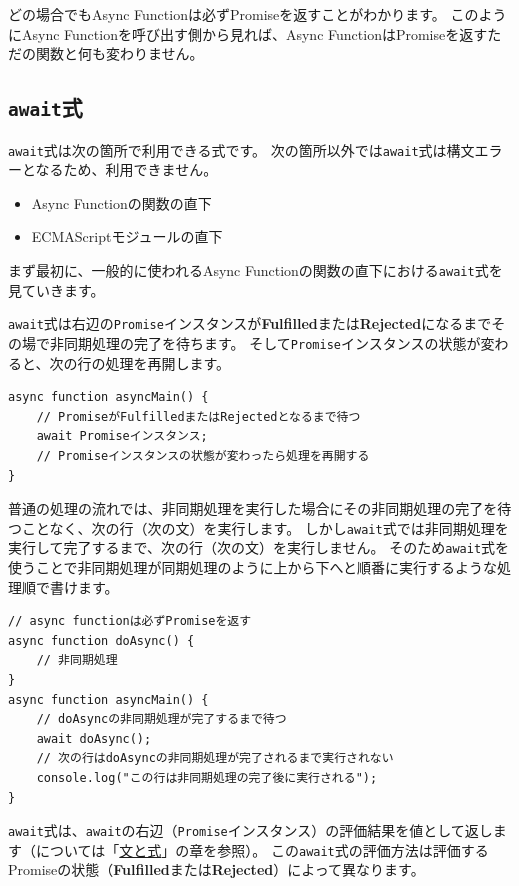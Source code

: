 どの場合でもAsync Functionは必ずPromiseを返すことがわかります。
このようにAsync Functionを呼び出す側から見れば、Async
FunctionはPromiseを返すただの関数と何も変わりません。

\hypertarget{await-expression}{%
\subsection{\texorpdfstring{\texttt{await}式}{await式}}\label{await-expression}}

\texttt{await}式は次の箇所で利用できる式です。
次の箇所以外では\texttt{await}式は構文エラーとなるため、利用できません。

\begin{itemize}
\item
  Async Functionの関数の直下
\item
  ECMAScriptモジュールの直下
\end{itemize}

まず最初に、一般的に使われるAsync Functionの関数の直下における\texttt{await}式を見ていきます。

\texttt{await}式は右辺の\texttt{Promise}インスタンスが\textbf{Fulfilled}または\textbf{Rejected}になるまでその場で非同期処理の完了を待ちます。
そして\texttt{Promise}インスタンスの状態が変わると、次の行の処理を再開します。

\begin{lstlisting}
async function asyncMain() {
    // PromiseがFulfilledまたはRejectedとなるまで待つ
    await Promiseインスタンス;
    // Promiseインスタンスの状態が変わったら処理を再開する
}
\end{lstlisting}

普通の処理の流れでは、非同期処理を実行した場合にその非同期処理の完了を待つことなく、次の行（次の文）を実行します。
しかし\texttt{await}式では非同期処理を実行して完了するまで、次の行（次の文）を実行しません。
そのため\texttt{await}式を使うことで非同期処理が同期処理のように上から下へと順番に実行するような処理順で書けます。

\begin{lstlisting}
// async functionは必ずPromiseを返す
async function doAsync() {
    // 非同期処理
}
async function asyncMain() {
    // doAsyncの非同期処理が完了するまで待つ
    await doAsync();
    // 次の行はdoAsyncの非同期処理が完了されるまで実行されない
    console.log("この行は非同期処理の完了後に実行される");
}
\end{lstlisting}

\texttt{await}式は、\texttt{await}の右辺（\texttt{Promise}インスタンス）の評価結果を値として返します（\textbf{}については「\hyperlink{statement-and-expression}{文と式}」の章を参照）。
この\texttt{await}式の評価方法は評価するPromiseの状態（\textbf{Fulfilled}または\textbf{Rejected}）によって異なります。

